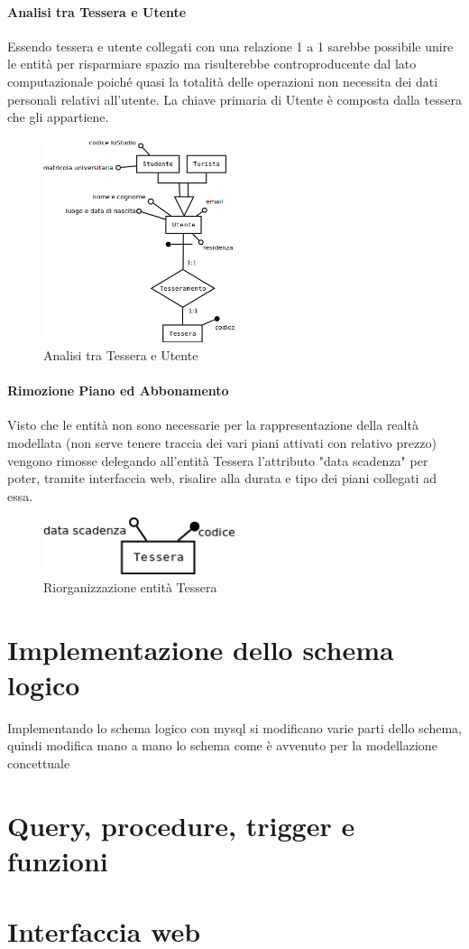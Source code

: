 \documentclass[a4paper,twoside]{article}
\begin{document}
\paragraph{Analisi tra Tessera e Utente}
Essendo tessera e utente collegati con una relazione 1 a 1 sarebbe possibile unire le entità per risparmiare spazio ma risulterebbe controproducente dal lato computazionale poiché quasi la totalità delle operazioni non necessita dei dati personali relativi all'utente. \newline
La chiave primaria di Utente è composta dalla tessera che gli appartiene.
\begin{figure}[H]
	\centering
	\includegraphics[width=0.5\textwidth]{Immagini-Grafici/Logico01.png}
	\caption{Analisi tra Tessera e Utente}
\end{figure}

\paragraph{Rimozione Piano ed Abbonamento}
Visto che le entità non sono necessarie per la rappresentazione della realtà modellata (non serve tenere traccia dei vari piani attivati con relativo prezzo) vengono rimosse delegando all'entità Tessera l'attributo "data scadenza" per poter, tramite interfaccia web, risalire alla durata e tipo dei piani collegati ad essa. \newline
\begin{figure}[H]
	\centering
	\includegraphics[width=0.5\textwidth]{Immagini-Grafici/Logico02.png}
	\caption{Riorganizzazione entità Tessera}
\end{figure}

\section{Implementazione dello schema logico}
Implementando lo schema logico con mysql si modificano varie parti dello schema, quindi modifica mano a mano lo schema come è avvenuto per la modellazione concettuale

\section{Query, procedure, trigger e funzioni}

\section{Interfaccia web}
\end{document}
